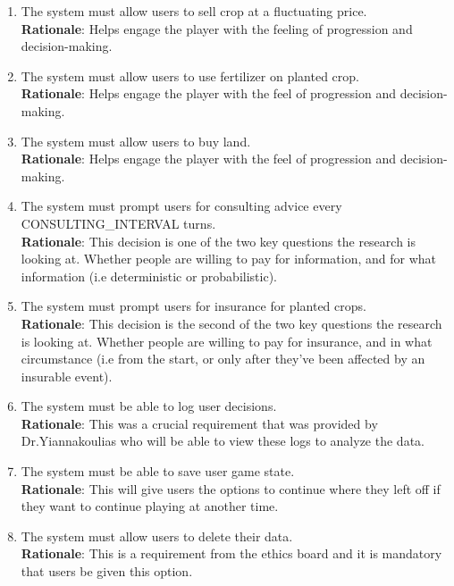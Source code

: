 \documentclass{article}
\begin{document}
\begin{enumerate}[{FR}1. ]
  \item The system must allow users to sell crop at a fluctuating price.\\
  \textbf{Rationale}: Helps engage the player with the feeling of progression and decision-making.
  \item The system must allow users to use fertilizer on planted crop.\\
  \textbf{Rationale}: Helps engage the player with the feel of progression and decision-making.
  \item The system must allow users to buy land.\\
  \textbf{Rationale}: Helps engage the player with the feel of progression and decision-making.
  \item The system must prompt users for consulting advice every CONSULTING\_INTERVAL turns.\\
  \textbf{Rationale}: This decision is one of the two key questions the research is looking at. Whether people are willing to pay for information, and for what information (i.e deterministic or probabilistic).
  \item The system must prompt users for insurance for planted crops.\\
  \textbf{Rationale}: This decision is the second of the two key questions the research is looking at. Whether people are willing to pay for insurance, and in what circumstance (i.e from the start, or only after they've been affected by an insurable event).
  \item The system must be able to log user decisions.\\
  \textbf{Rationale}: This was a crucial requirement that was provided by Dr.Yiannakoulias who will be able to view these logs to analyze the data.
  \item The system must be able to save user game state.\\
  \textbf{Rationale}: This will give users the options to continue where they left off if they want to continue playing at another time.
  \item \label{FR15} The system must allow users to delete their data.\\
  \textbf{Rationale}: This is a requirement from the ethics board and it is mandatory that users be given this option.

\end{enumerate}
\end{document}
